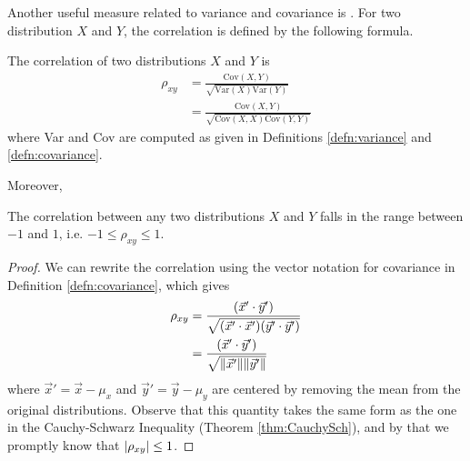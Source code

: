Another useful measure related to variance and covariance is . For two distribution $X$ and $Y$, the correlation is defined by the following formula.
\begin{defn}[Correlation]
The correlation of two distributions $X$ and $Y$ is
\begin{align*}
\rho_{xy} &= \frac{\text{Cov}(X,Y)}{\sqrt{\text{Var}(X) \text{Var}(Y)}} \\
&= \frac{\text{Cov}(X,Y)}{\sqrt{\text{Cov}(X,X) \text{Cov}(Y,Y)}}
\end{align*}
where Var and Cov are computed as given in Definitions \ref{defn:variance} and \ref{defn:covariance}.
\end{defn}
Moreover,
\begin{proper}
The correlation between any two distributions $X$ and $Y$ falls in the range between $-1$ and $1$, i.e. $-1 \leq \rho_{xy} \leq 1$.
\end{proper}
\begin{proof}
We can rewrite the correlation using the vector notation for covariance in Definition \ref{defn:covariance}, which gives
\begin{align*}
\rho_{xy} &= \frac{(\vec{x}' \cdot \vec{y}')}{\sqrt{(\vec{x}'\cdot\vec{x}')(\vec{y}'\cdot\vec{y}')}} \\
&= \frac{(\vec{x}' \cdot \vec{y}')}{\sqrt{{\norm{\vec{x}'}}\norm{\vec{y}'}}}
\end{align*}
where $\vec{x}' = \vec{x} - \mu_x$ and $\vec{y}' = \vec{y} - \mu_y$ are centered by removing the mean from the original distributions. Observe that this quantity takes the same form as the one in the Cauchy-Schwarz Inequality (Theorem \ref{thm:CauchySch}), and by that we promptly know that $\abs{\rho_{xy}} \leq 1$.    
\end{proof}

